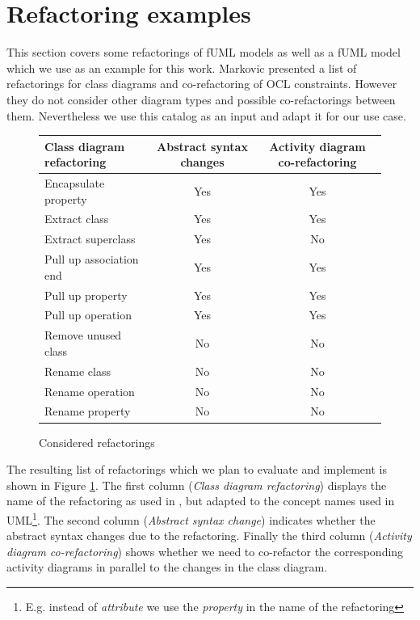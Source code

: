 \documentclass{llncs}
\begin{document}


\section{Refactoring examples}
\label{refactoring-examples}

This section covers some refactorings of fUML models as well as a fUML model which we use as an example for this work. 
Markovic \cite{DBLP:journals/sosym/MarkovicB08} presented a list of refactorings for class 
diagrams and co-refactoring of OCL constraints. However they do not consider other diagram types and possible co-refactorings between 
them. Nevertheless we use this catalog as an input and adapt it for our use case. 

\begin{figure}[h!t]
 \centering
 \begin{tabular}[]{l | c | c}
  Class diagram refactoring & Abstract syntax changes & Activity diagram co-refactoring\\
  \hline
  Encapsulate property & Yes & Yes\\
  Extract class & Yes & Yes\\
  Extract superclass & Yes & No\\
  Pull up association end & Yes & Yes\\
  Pull up property & Yes & Yes\\
  Pull up operation & Yes & Yes\\
  Remove unused class & No & No\\
  Rename class & No & No\\
  Rename operation & No & No\\
  Rename property & No & No\\
 \end{tabular}
 \caption{Considered refactorings}
 \label{fig:refactoringlist}
\end{figure}

The resulting list of 
refactorings which we plan to evaluate and implement is shown in Figure \ref{fig:refactoringlist}. 
The first column (\textit{Class diagram refactoring}) displays the name of the refactoring as used in \cite{DBLP:journals/sosym/MarkovicB08}, but adapted to the 
concept names used in UML\footnote{E.g. instead of \textit{attribute} we use the \textit{property} in the name of the refactoring}. 
The second column (\textit{Abstract syntax change}) indicates whether the abstract syntax changes due to the refactoring.
Finally the third column (\textit{Activity diagram co-refactoring}) shows whether we need to co-refactor the corresponding activity diagrams 
in parallel to the changes in the class diagram.
\end{document}
